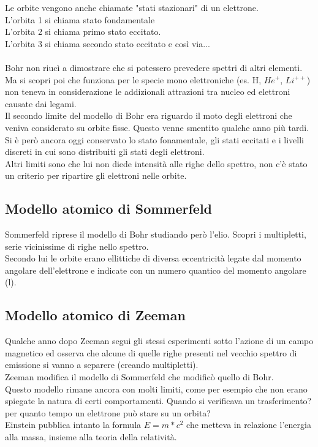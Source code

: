 Le orbite vengono anche chiamate "stati stazionari" di un elettrone.\\
L'orbita 1 si chiama stato fondamentale\\
L'orbita 2 si chiama primo stato eccitato.\\
L'orbita 3 si chiama secondo stato eccitato e così via...\\\\
Bohr non riucì a dimostrare che si potessero prevedere spettri di altri elementi. Ma si scopri poi che funziona per le specie mono elettroniche (es. H, $He^+$, $Li^{++}$) non teneva in considerazione le addizionali attrazioni tra nucleo ed elettroni causate dai legami.\\
Il secondo limite del modello di Bohr era riguardo il moto degli elettroni che veniva considerato su orbite fisse. Questo venne smentito qualche anno più tardi.\\
Si è però ancora oggi conservato lo stato fonamentale, gli stati eccitati e i livelli discreti in cui sono distribuiti gli stati degli elettroni.\\
Altri limiti sono che lui non diede intensità alle righe dello spettro, non c'è stato un criterio per ripartire gli elettroni nelle orbite.\\
\subsection{Modello atomico di Sommerfeld}
Sommerfeld riprese il modello di Bohr studiando però l'elio. Scopri i multipletti, serie vicinissime di righe nello spettro.\\
Secondo lui le orbite erano ellittiche di diversa eccentricità legate dal momento angolare dell’elettrone e indicate con un numero quantico del momento angolare (l).
\subsection{Modello atomico di Zeeman}
Qualche anno dopo Zeeman segui gli stessi esperimenti sotto l’azione di un campo magnetico ed osserva che alcune di quelle righe presenti nel vecchio spettro di emissione si vanno a separere (creando multipletti).\\
Zeeman modifica il modello di Sommerfeld che modificò quello di Bohr.\\
Questo modello rimane ancora con molti limiti, come per esempio che non erano spiegate la natura di certi comportamenti. Quando si verificava un trasferimento? per quanto tempo un elettrone può stare su un orbita?\\
Einstein pubblica intanto la formula $E = m * c^2$ che metteva in relazione l’energia alla massa, insieme alla teoria della relatività.
